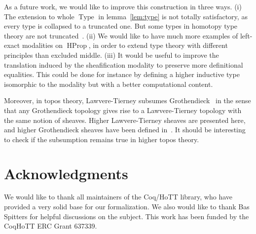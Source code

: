 \documentclass[preprint,9pt,numbers]{sigplanconf}
\newcommand{\mynote}[2]{
    \fbox{\bfseries\sffamily\scriptsize#1}
    {\small$\blacktriangleright$\textsf{\emph{#2}}$\blacktriangleleft$}~}
\newcommand\nt[1]{\mynote{NT}{#1}}
\newcommand{\eg}{e.g,\xspace}
\DeclareMathOperator{\Type}{Type}
\DeclareMathOperator{\HProp}{HProp}
\begin{document}

As a future work, we would like to improve this construction in three
ways.
(i) The extension to whole $\Type$ in lemma~\ref{lem:type} is not
  totally satisfactory, as every type is collapsed to a truncated
  one. But some types in homotopy type theory are not
  truncated~\cite[Example 8.8.6]{hottbook}.
(ii) 
  We would like to have much more examples of left-exact modalities on
  $\HProp$, in order to extend type theory with different principles
  than excluded middle.
(iii) It would be useful to improve the translation induced by the
  sheafification modality to preserve more definitional equalities.
  This could be done for instance by defining a higher inductive type
  isomorphic to the modality but with a better computational content. 

Moreover, in topos theory, Lawvere-Tierney subsumes Grothen\-dieck~\cite[Section~V.4]{maclanemoerdijk} in the sense that any
Grothen\-dieck topology gives rise to a Lawvere-Tierney topology with
the same notion of sheaves. Higher Lawvere-Tierney sheaves are
presented here, and higher Grothendieck sheaves have been defined
in~\cite{lurie}. It should be interesting to check if the subsumption
remains true in higher topos theory.



\section*{Acknowledgments}

We would like to thank all maintainers of the Coq/HoTT library, who
have provided a very solid base for our formalization. 
%
We also would like to thank Bas Spitters for helpful discussions on
the subject.
%
This work has been funded by the CoqHoTT ERC Grant 637339.



\end{document}
